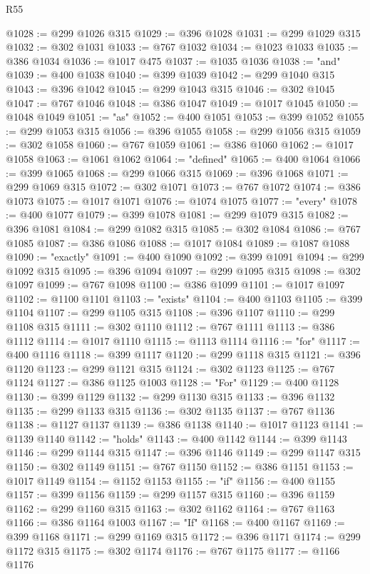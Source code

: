 \begin{lexlean}{R55}
\begin{coremodule}
@1028 := @299 @1026 @315
@1029 := @396 @1028
@1031 := @299 @1029 @315
@1032 := @302 @1031
@1033 := @767 @1032
@1034 := @1023 @1033
@1035 := @386 @1034
@1036 := @1017 @475
@1037 := @1035 @1036
@1038 := "and"
@1039 := @400 @1038
@1040 := @399 @1039
@1042 := @299 @1040 @315
@1043 := @396 @1042
@1045 := @299 @1043 @315
@1046 := @302 @1045
@1047 := @767 @1046
@1048 := @386 @1047
@1049 := @1017 @1045
@1050 := @1048 @1049
@1051 := "as"
@1052 := @400 @1051
@1053 := @399 @1052
@1055 := @299 @1053 @315
@1056 := @396 @1055
@1058 := @299 @1056 @315
@1059 := @302 @1058
@1060 := @767 @1059
@1061 := @386 @1060
@1062 := @1017 @1058
@1063 := @1061 @1062
@1064 := "defined"
@1065 := @400 @1064
@1066 := @399 @1065
@1068 := @299 @1066 @315
@1069 := @396 @1068
@1071 := @299 @1069 @315
@1072 := @302 @1071
@1073 := @767 @1072
@1074 := @386 @1073
@1075 := @1017 @1071
@1076 := @1074 @1075
@1077 := "every"
@1078 := @400 @1077
@1079 := @399 @1078
@1081 := @299 @1079 @315
@1082 := @396 @1081
@1084 := @299 @1082 @315
@1085 := @302 @1084
@1086 := @767 @1085
@1087 := @386 @1086
@1088 := @1017 @1084
@1089 := @1087 @1088
@1090 := "exactly"
@1091 := @400 @1090
@1092 := @399 @1091
@1094 := @299 @1092 @315
@1095 := @396 @1094
@1097 := @299 @1095 @315
@1098 := @302 @1097
@1099 := @767 @1098
@1100 := @386 @1099
@1101 := @1017 @1097
@1102 := @1100 @1101
@1103 := "exists"
@1104 := @400 @1103
@1105 := @399 @1104
@1107 := @299 @1105 @315
@1108 := @396 @1107
@1110 := @299 @1108 @315
@1111 := @302 @1110
@1112 := @767 @1111
@1113 := @386 @1112
@1114 := @1017 @1110
@1115 := @1113 @1114
@1116 := "for"
@1117 := @400 @1116
@1118 := @399 @1117
@1120 := @299 @1118 @315
@1121 := @396 @1120
@1123 := @299 @1121 @315
@1124 := @302 @1123
@1125 := @767 @1124
@1127 := @386 @1125 @1003
@1128 := "For"
@1129 := @400 @1128
@1130 := @399 @1129
@1132 := @299 @1130 @315
@1133 := @396 @1132
@1135 := @299 @1133 @315
@1136 := @302 @1135
@1137 := @767 @1136
@1138 := @1127 @1137
@1139 := @386 @1138
@1140 := @1017 @1123
@1141 := @1139 @1140
@1142 := "holds"
@1143 := @400 @1142
@1144 := @399 @1143
@1146 := @299 @1144 @315
@1147 := @396 @1146
@1149 := @299 @1147 @315
@1150 := @302 @1149
@1151 := @767 @1150
@1152 := @386 @1151
@1153 := @1017 @1149
@1154 := @1152 @1153
@1155 := "if"
@1156 := @400 @1155
@1157 := @399 @1156
@1159 := @299 @1157 @315
@1160 := @396 @1159
@1162 := @299 @1160 @315
@1163 := @302 @1162
@1164 := @767 @1163
@1166 := @386 @1164 @1003
@1167 := "If"
@1168 := @400 @1167
@1169 := @399 @1168
@1171 := @299 @1169 @315
@1172 := @396 @1171
@1174 := @299 @1172 @315
@1175 := @302 @1174
@1176 := @767 @1175
@1177 := @1166 @1176

\end{coremodule}
\end{lexlean}
